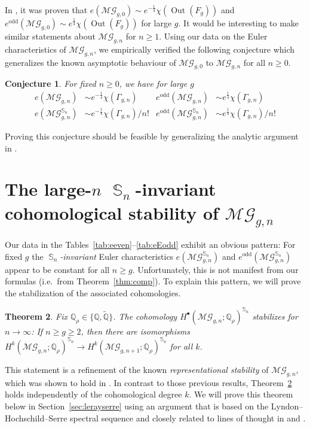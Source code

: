 \documentclass[oneside]{amsart}
\newtheorem{theorem}{Theorem}[section]
\newtheorem{conjecture}[theorem]{Conjecture}
\theoremstyle{remark}
\newcommand{\Q}{\mathbb{Q}}
\DeclareMathOperator{\SG}{{\mathbb S}}
\newcommand{\Out}{{\operatorname{Out}}}
\newcommand{\MG}{\mathcal{MG}}
\begin{document}
In \cite{BV2}, it was proven that 
$e(\MG_{g,0}) \sim e^{-\frac14} \chi(\Out(F_{g}))$ 
and 
$e^\mathrm{odd}(\MG_{g,0}) \sim e^{\frac14} \chi(\Out(F_{g}))$ for large $g$.
It would be interesting to make similar statements about $\MG_{g,n}$ for $n \geq 1$.
Using our data on the Euler characteristics of $\MG_{g,n}$, we empirically verified the following conjecture which generalizes the known asymptotic behaviour of $\MG_{g,0}$ to $\MG_{g,n}$ for all $n \geq 0$.
\begin{conjecture} 
\label{conj:asymp}
For fixed $n \geq 0$, we have for large $g$
\begin{align*} e(\MG_{g,n}) &\sim e^{-\frac14} \chi(\Gamma_{g,n}) & e^\mathrm{odd}(\MG_{g,n}) &\sim e^{\frac14} \chi(\Gamma_{g,n}) \\
e(\MG_{g,n}^{\SG_n}) &\sim e^{-\frac14} \chi(\Gamma_{g,n})/n! & e^\mathrm{odd}(\MG_{g,n}^{\SG_n}) &\sim e^{\frac14} \chi(\Gamma_{g,n})/n! \end{align*}
\end{conjecture}
Proving this conjecture should be feasible by generalizing the analytic argument in \cite[Sec.~4]{BV2}.

\section{The large-$n$ \texorpdfstring{$\SG_n$}{Sn}-invariant cohomological stability of \texorpdfstring{$\MG_{g,n}$}{MGgn}}
%
\label{sec:stable}
Our data in the Tables~\ref{tab:eeven}--\ref{tab:eEodd} exhibit an obvious pattern:
For fixed $g$  the \emph{$\SG_n$-invariant} Euler characteristics $e(\MG_{g,n}^{\SG_n})$ and $e^\mathrm{odd}(\MG_{g,n}^{\SG_n})$ appear to be constant for all $n\geq g$. %
%
%
%
%
%
Unfortunately, this is not manifest from our formulas (i.e.~from Theorem~\ref{thm:comp}).
To explain this pattern, we will prove the stabilization of the associated cohomologies.
\begin{theorem}
\label{thm:stab}
Fix $\mathbb Q_\rho \in \{ \mathbb Q, \widetilde{ \mathbb Q} \}$.
The cohomology $H^\bullet(\MG_{g,n};\Q_\rho)^{\SG_n}$ stabilizes for $n\rightarrow \infty$:
If  $n \geq g \geq 2$, then there are  isomorphisms
$ H^k(\MG_{g,n};\Q_\rho)^{\SG_n}\rightarrow H^k(\MG_{g,n+1};\Q_\rho)^{\SG_n}$ for all $k$.
\end{theorem}
This statement is a refinement of the known 
\emph{representational stability} \cite{church2013representation} of $\MG_{g,n}$, which was shown to hold in \cite{conant2016assembling}. 
In contrast to those previous results, Theorem~\ref{thm:stab} holds independently of the cohomological degree $k$.
We will prove this theorem below in Section~\ref{sec:lerayserre}
using an argument that is based on the  Lyndon--Hochschild--Serre spectral sequence and 
closely related to lines of thought in \cite{conant2016assembling} and \cite{saied2015fi}.
\end{document}
